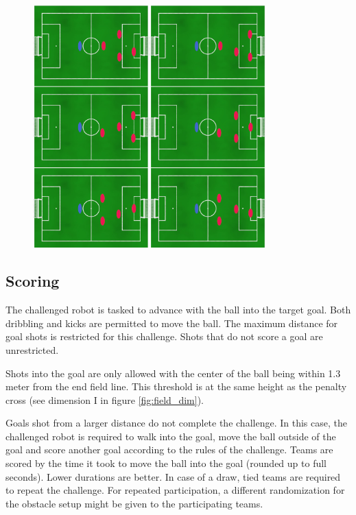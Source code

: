\begin{figure}[ht]
    \centering
	\includegraphics[width=0.8\textwidth]{figs/obstacle_challenge_2021_a.jpeg}
\end{figure}

\subsection{Scoring}

The challenged robot is tasked to advance with the ball into the target goal. Both dribbling and kicks are permitted to move the ball. The maximum distance for goal shots is restricted for this challenge. Shots that do not score a goal are unrestricted.

Shots into the goal are only allowed with the center of the ball being within 1.3 meter from the end field line. This threshold is at the same height as the penalty cross (see dimension I in figure \ref{fig:field_dim}).

Goals shot from a larger distance do not complete the challenge. In this case, the challenged robot is required to walk into the goal, move the ball outside of the goal and score another goal according to the rules of the challenge.
Teams are scored by the time it took to move the ball into the goal (rounded up to full seconds). Lower durations are better. In case of a draw, tied teams are required to repeat the challenge. For repeated participation, a different randomization for the obstacle setup might be given to the participating teams.

